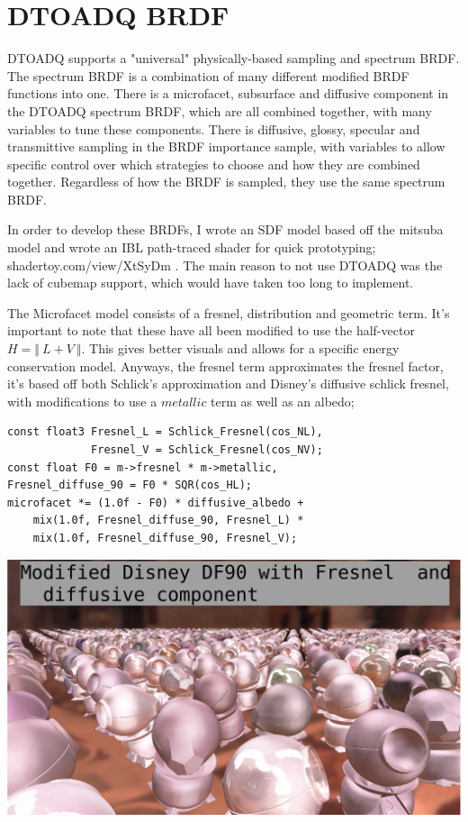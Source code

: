 \message{ !name(test.tex)}\documentclass{article}
\begin{document}
  \section{DTOADQ BRDF}
  DTOADQ supports a "universal" physically-based sampling and spectrum BRDF. The spectrum BRDF is a combination of many different modified BRDF functions into one. There is a microfacet, subsurface and diffusive component in the DTOADQ spectrum BRDF, which are all combined together, with many variables to tune these components. There is diffusive, glossy, specular and transmittive sampling in the BRDF importance sample, with variables to allow specific control over which strategies to choose and how they are combined together. Regardless of how the BRDF is sampled, they use the same spectrum BRDF.
  
  In order to develop these BRDFs, I wrote an SDF model based off the mitsuba model and wrote an IBL path-traced shader for quick prototyping; shadertoy.com/view/XtSyDm . The main reason to not use DTOADQ was the lack of cubemap support, which would have taken too long to implement.
  
  The Microfacet model consists of a fresnel, distribution and geometric term. It's important to note that these have all been modified to use the half-vector $H = \Vert\:L+V\:\Vert$. This gives better visuals and allows for a specific energy conservation model. Anyways, the fresnel term approximates the fresnel factor, it's based off both Schlick's approximation and Disney's diffusive schlick fresnel, with modifications to use a $metallic$ term as well as an albedo;
  \begin{lstlisting}
const float3 Fresnel_L = Schlick_Fresnel(cos_NL),
             Fresnel_V = Schlick_Fresnel(cos_NV);
const float F0 = m->fresnel * m->metallic,
Fresnel_diffuse_90 = F0 * SQR(cos_HL);
microfacet *= (1.0f - F0) * diffusive_albedo +
    mix(1.0f, Fresnel_diffuse_90, Fresnel_L) *
    mix(1.0f, Fresnel_diffuse_90, Fresnel_V);
  \end{lstlisting}
  \includegraphics[scale=0.20]{fresnel}
  
\end{document}
